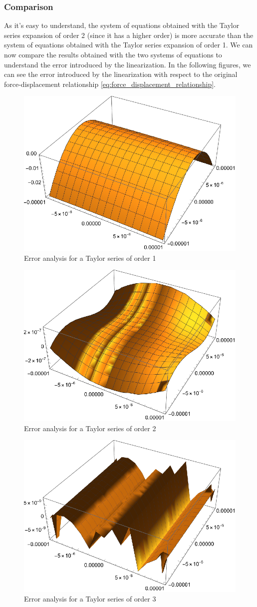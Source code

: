 \subsubsection{Comparison}

As it's easy to understand, the system of equations obtained with the Taylor series expansion of order 2 (since it has a higher order) is more accurate than the system of equations obtained with the Taylor series expansion of order 1.
We can now compare the results obtained with the two systems of equations to understand the error introduced by the linearization.
In the following figures, we can see the error introduced by the linearization with respect to the original force-displacement relationship \ref{eq:force_displacement_relationship}.

\begin{figure}[H]
    \centering
    \includegraphics[width=.5\textwidth]{./pdf/residual_taylor_order_1}
    \caption{Error analysis for a Taylor series of order 1}
    \label{fig:residual_taylor_order_1}
\end{figure}

\begin{figure}[H]
    \centering
    \includegraphics[width=.5\textwidth]{./pdf/residual_taylor_order_2}
    \caption{Error analysis for a Taylor series of order 2}
    \label{fig:residual_taylor_order_2}
\end{figure}

\begin{figure}[H]
    \centering
    \includegraphics[width=.5\textwidth]{./pdf/residual_taylor_order_3}
    \caption{Error analysis for a Taylor series of order 3}
    \label{fig:residual_taylor_order_3}
\end{figure}

